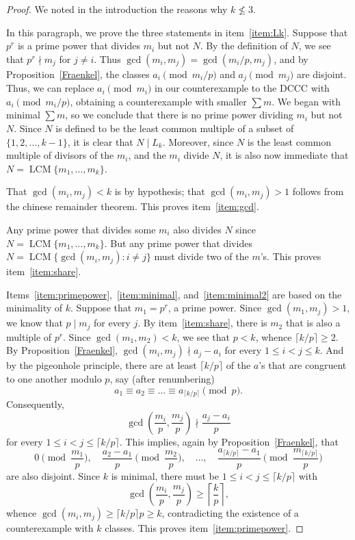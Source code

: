 \documentclass[12pt]{article}
\newcommand{\ceiling}[1]{\mbox{$\big\lceil #1 \big\rceil$}}
\DeclareMathOperator{\lcm}{LCM}
\begin{document}
\begin{proof}
We noted in the introduction the reasons why $k\not\leq 3$.

In this paragraph, we prove the three statements in item~\ref{item:Lk}. Suppose that $p^r$ is a prime power that
divides $m_i$ but not $N$. By the definition of $N$, we see that $p^r \nmid m_j$ for $j\not=i$. Thus
$\gcd(m_i,m_j)=\gcd(m_i/p,m_j)$, and by Proposition~\ref{Fraenkel}, the classes $a_i \pmod{m_i/p}$ and
$a_j\pmod{m_j}$ are disjoint. Thus, we can replace $a_i \pmod{m_i}$ in our counterexample to the DCCC with $a_i
\pmod{m_i/p}$, obtaining a counterexample with smaller $\sum m$. We began with minimal $\sum m$, so we conclude
that there is no prime power dividing $m_i$ but not $N$. Since $N$ is defined to be the least common multiple of
a subset of $\{1,2,\dots,k-1\}$, it is clear that $N\mid L_k$. Moreover, since $N$ is the least common multiple
of divisors of the $m_i$, and the $m_i$ divide $N$, it is also now immediate that $N=\lcm\{m_1,\dots,m_k\}$.

That $\gcd(m_i,m_j)<k$ is by hypothesis; that $\gcd(m_i,m_j)>1$ follows from the chinese remainder theorem. This
proves item~\ref{item:gcd}.

Any prime power that divides some $m_i$ also divides $N$ since $N=\lcm\{m_1,\dots,m_k\}$. But any prime power
that divides $N=\lcm\{\gcd(m_i,m_j)\colon i\not= j\}$ must divide two of the $m$'s. This proves
item~\ref{item:share}.

Items~\ref{item:primepower},~\ref{item:minimal}, and~\ref{item:minimal2} are based on the minimality of $k$.
Suppose that $m_1=p^r$, a prime power. Since $\gcd(m_1,m_j)>1$, we know that $p\mid m_j$ for every $j$. By
item~\ref{item:share}, there is $m_2$ that is also a multiple of $p^r$. Since $\gcd(m_1,m_2)<k$, we see that
$p<k$, whence $\ceiling{k/p}\ge 2$. By Proposition~\ref{Fraenkel}, $\gcd(m_i,m_j) \nmid a_j-a_i$ for every $1\le
i < j\le k$. And by the pigeonhole principle, there are at least $\ceiling{k/p}$ of the $a$'s that are congruent
to one another modulo $p$, say (after renumbering)
    \[a_1\equiv a_2 \equiv \dots \equiv a_{\lceil k/p \rceil} \pmod{p}.\]
Consequently,
    \[\gcd\left(\dfrac{m_i}p,\dfrac{m_j}p\right) \nmid \frac{a_j-a_i}{p}\]
for every $1\le i < j\le {\lceil k/p \rceil}$. This implies, again by Proposition~\ref{Fraenkel}, that
    \[0 \pmod{\dfrac{m_1}p},\quad \frac{a_2-a_1}{p} \pmod{\dfrac{m_2}p},\quad \dots,\quad
        \frac{a_{\lceil k/p \rceil}-a_1}{p} \pmod{\frac{m_{\lceil k/p \rceil}}p}\]
are also disjoint. Since $k$ is minimal, there must be $1\le i < j \le {\lceil k/p \rceil}$ with
    \[\gcd \left( \frac{m_i}{p}, \frac{m_j}{p} \right) \geq {\left\lceil \frac{k}{p} \right\rceil},\]
whence $\gcd(m_i,m_j) \ge {\lceil k/p \rceil} p \ge k$, contradicting the existence of a counterexample with $k$
classes. This proves item~\ref{item:primepower}.


\end{proof}
\end{document}
